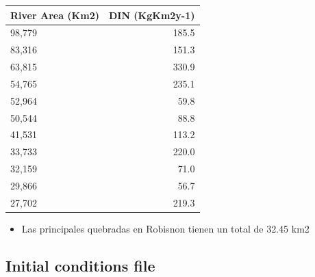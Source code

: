 \documentclass[11pt]{article}
\begin{document}
\begin{center}
\begin{tabular}{lr}
 River Area (Km2)  &  DIN (KgKm2y-1)  \\
\hline
 98,779            &           185.5  \\
 83,316            &           151.3  \\
 63,815            &           330.9  \\
 54,765            &           235.1  \\
 52,964            &            59.8  \\
 50,544            &            88.8  \\
 41,531            &           113.2  \\
 33,733            &           220.0  \\
 32,159            &            71.0  \\
 29,866            &            56.7  \\
 27,702            &           219.3  \\
\end{tabular}
\end{center}



\begin{itemize}
\item Las principales quebradas en Robisnon tienen un total de 32.45 km2
\end{itemize}
\subsection*{Initial conditions file}
\label{sec-5-4}
\end{document}

